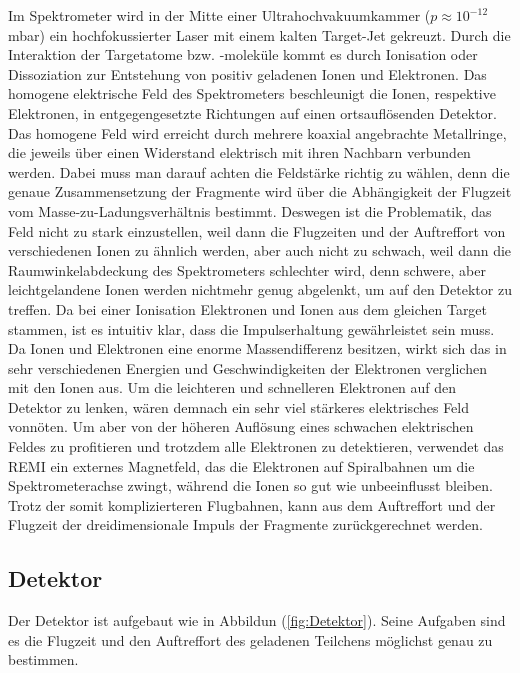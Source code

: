 Im Spektrometer wird in der Mitte einer Ultrahochvakuumkammer ($p \approx 10^{-12}$ mbar) ein hochfokussierter Laser mit einem kalten Target-Jet gekreuzt. Durch die Interaktion der Targetatome bzw. -moleküle kommt es durch Ionisation oder Dissoziation zur Entstehung von positiv geladenen Ionen und Elektronen. Das homogene elektrische Feld des Spektrometers beschleunigt die Ionen, respektive Elektronen, in entgegengesetzte Richtungen auf einen ortsauflösenden Detektor. Das homogene Feld wird erreicht durch mehrere koaxial angebrachte Metallringe, die jeweils über einen Widerstand elektrisch mit ihren Nachbarn verbunden werden. Dabei muss man darauf achten die Feldstärke richtig zu wählen, denn die genaue Zusammensetzung der Fragmente wird über die Abhängigkeit der Flugzeit vom Masse-zu-Ladungsverhältnis bestimmt. Deswegen ist die Problematik, das Feld nicht zu stark einzustellen, weil dann die Flugzeiten und der Auftreffort von verschiedenen Ionen zu ähnlich werden, aber auch nicht zu schwach, weil dann die Raumwinkelabdeckung des Spektrometers schlechter wird, denn schwere, aber leichtgelandene Ionen werden nichtmehr genug abgelenkt, um auf den Detektor zu treffen.
Da bei einer Ionisation Elektronen und Ionen aus dem gleichen Target stammen, ist es intuitiv klar, dass die Impulserhaltung gewährleistet sein muss. Da Ionen und Elektronen eine enorme Massendifferenz besitzen, wirkt sich das in sehr verschiedenen Energien und Geschwindigkeiten der Elektronen verglichen mit den Ionen aus. Um die leichteren und schnelleren Elektronen auf den Detektor zu lenken, wären demnach ein sehr viel stärkeres elektrisches Feld vonnöten. Um aber von der höheren Auflösung eines schwachen elektrischen Feldes zu profitieren und trotzdem alle Elektronen zu detektieren, verwendet das REMI ein externes Magnetfeld, das die Elektronen auf Spiralbahnen um die Spektrometerachse zwingt, während die Ionen so gut wie unbeeinflusst bleiben. Trotz der somit komplizierteren Flugbahnen, kann aus dem Auftreffort und der Flugzeit der dreidimensionale Impuls der Fragmente zurückgerechnet werden. 

\subsection{Detektor}

Der Detektor ist aufgebaut wie in Abbildun (\ref{fig:Detektor}). Seine Aufgaben sind es die Flugzeit und den Auftreffort des geladenen Teilchens möglichst genau zu bestimmen. 

